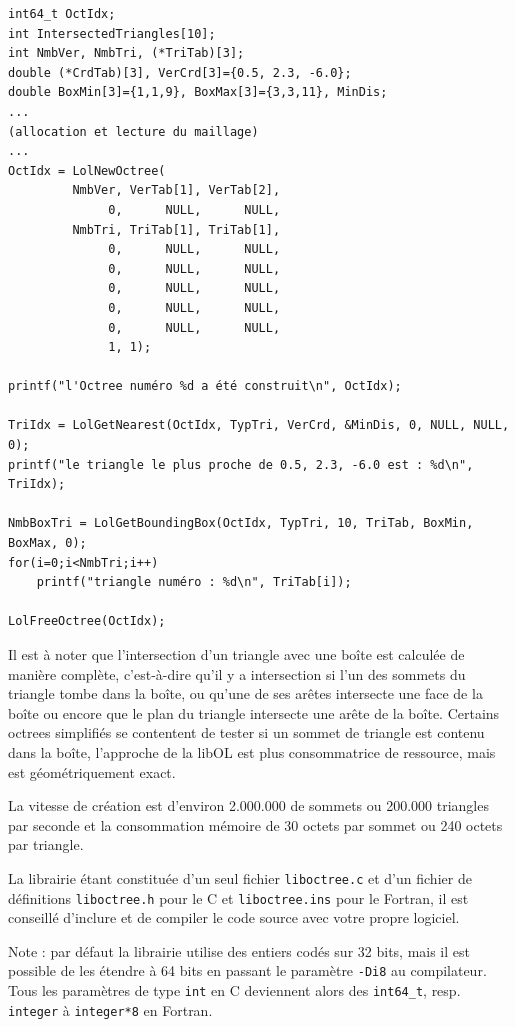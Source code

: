\documentclass[a4paper,12pt]{article}
\begin{document}
\begin{tt}
\begin{verbatim}
int64_t OctIdx;
int IntersectedTriangles[10];
int NmbVer, NmbTri, (*TriTab)[3];
double (*CrdTab)[3], VerCrd[3]={0.5, 2.3, -6.0};
double BoxMin[3]={1,1,9}, BoxMax[3]={3,3,11}, MinDis;
...
(allocation et lecture du maillage)
...
OctIdx = LolNewOctree(
         NmbVer, VerTab[1], VerTab[2],
              0,      NULL,      NULL,
         NmbTri, TriTab[1], TriTab[1],
              0,      NULL,      NULL,
              0,      NULL,      NULL,
              0,      NULL,      NULL,
              0,      NULL,      NULL,
              0,      NULL,      NULL,
              1, 1);

printf("l'Octree numéro %d a été construit\n", OctIdx);

TriIdx = LolGetNearest(OctIdx, TypTri, VerCrd, &MinDis, 0, NULL, NULL, 0);
printf("le triangle le plus proche de 0.5, 2.3, -6.0 est : %d\n", TriIdx);

NmbBoxTri = LolGetBoundingBox(OctIdx, TypTri, 10, TriTab, BoxMin, BoxMax, 0);
for(i=0;i<NmbTri;i++)
    printf("triangle numéro : %d\n", TriTab[i]);

LolFreeOctree(OctIdx);
\end{verbatim}
\end{tt}
\normalfont

Il est à noter que l'intersection d'un triangle avec une boîte est calculée de manière complète, c'est-à-dire qu'il y a intersection si l'un des sommets du triangle tombe dans la boîte, ou qu’une de ses arêtes intersecte une face de la boîte ou encore que le plan du triangle intersecte une arête de la boîte. Certains octrees simplifiés se contentent de tester si un sommet de triangle est contenu dans la boîte, l'approche de la libOL est plus consommatrice de ressource, mais est géométriquement exact.

La vitesse de création est d'environ 2.000.000 de sommets ou 200.000 triangles par seconde et la consommation mémoire de 30 octets par sommet ou 240 octets par triangle.

La librairie étant constituée d'un seul fichier {\tt liboctree.c} et d'un fichier de définitions {\tt liboctree.h} pour le C et {\tt liboctree.ins} pour le Fortran, il est conseillé d'inclure et de compiler le code source avec votre propre logiciel.

Note : par défaut la librairie utilise des entiers codés sur 32 bits, mais il est possible de les étendre à 64 bits en passant le paramètre {\tt -Di8} au compilateur. Tous les paramètres de type {\tt int} en C deviennent alors des {\tt int64\_t}, resp. {\tt integer} à {\tt integer*8} en Fortran.
\end{document}
